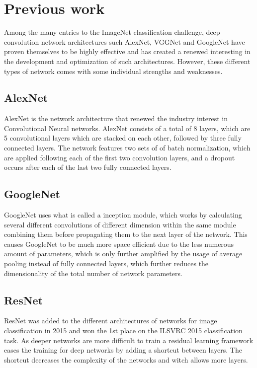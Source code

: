 \documentclass{kthreport}
\begin{document}
\section{Previous work}
Among the many entries to the ImageNet classification challenge, deep convolution network architectures such AlexNet, VGGNet and GoogleNet have proven themselves to be highly effective and has created a renewed interesting in the development and optimization of such architectures. However, these different types of network comes with some individual strengths and weaknesses.



\subsection{AlexNet}
AlexNet is the network architecture that renewed the industry interest in Convolutional Neural networks. AlexNet consists of a total of 8 layers, which are 5 convolutional layers which are stacked on each other, followed by three fully connected layers. The network features two sets of of batch normalization, which are applied following each of the first two convolution layers, and a dropout occurs after each of the last two fully connected layers.
\subsection{GoogleNet}
GoogleNet uses what is called a inception module, which works by calculating several different convolutions of different dimension within the same module combining them before propagating them to the next layer of the network\cite{szegedy2016rethinking}. This causes GoogleNet to be much more space efficient due to the less numerous amount of parameters, which is only further amplified by the usage of average pooling instead of fully connected layers, which further reduces the dimensionality of the total number of network parameters.
\subsection{ResNet}
ResNet was added to the different architectures of networks for image classification in 2015 and won the 1st place on the ILSVRC 2015 classification task. As deeper networks are more difficult to train a residual learning framework eases the training for deep networks by adding a shortcut between layers. The shortcut decreases the complexity of the networks and witch allows more layers. 
\end{document}
